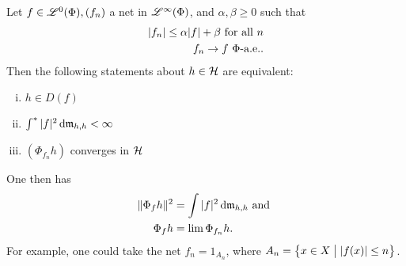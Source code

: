 \begin{lem}
 
Let $f \in \mathscr{L}^0(\Phi), (f_n)$ a net in $\mathscr{L}^\infty (\Phi)$, and $\alpha, \beta \geq 0$ such that
 \begin{align*}
   | f_n | \leq \alpha |f| + \beta \text{ for all } n \\
   f_n \to f ~\Phi\text{-a.e.}.
 \end{align*}
Then the following statements about $h \in \mathcal{H}$ are equivalent:
\begin{enumerate}[(i)]
 \item $h \in D(f)$
 \item $\int ^{*} | f| ^2 \operatorname{d}\! \mathfrak{m}_{h,h} < \infty$
 \item $(\Phi_{f_n}h)$ converges in $ \mathcal{H}$
\end{enumerate}
One then has
\begin{align*}
  \| \Phi_f h \| ^2 &= \int |f|^2 \operatorname{d}\! \mathfrak{m}_{h, h } \text{ and }\\
  \Phi_{f }h &= \lim \Phi_{f_n} h.
\end{align*}
For example, one could take the net $f_n = 1_{A_n}$, where $A_n = \left\lbrace x \in X \bigm | | f(x) | \leq n \right\rbrace$.
\end{lem}

